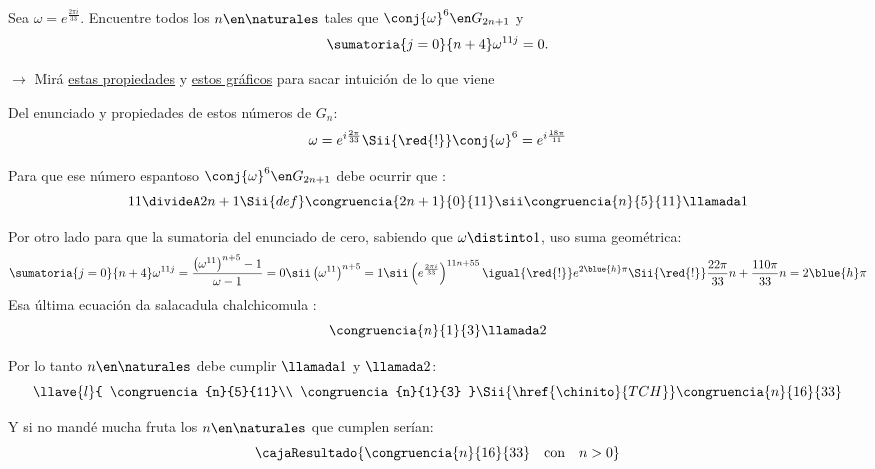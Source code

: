 \begin{enunciado}{\ejExtra}
  Sea $\omega = e^{\frac{2\pi i}{33}}$. Encuentre todos los $n \en \naturales$ tales que
  $\conj{\omega}^6 \en G_{2n+1}$ y
  $$
    \sumatoria{j=0}{n+4} \omega^{11j} = 0.
  $$
\end{enunciado}

\begin{center}
  $\to$ Mirá \hyperlink{teoria6:propiedadesGn}{estas propiedades} y  \hyperlink{teoria6:gruposGn}{estos gráficos} para sacar intuición de lo que viene
\end{center}

Del enunciado y propiedades de estos números de $G_n$:
$$
  \omega = e^{i\frac{2\pi }{33}}
  \Sii{\red{!}}
  \conj{\omega}^6 = e^{i\frac{18\pi }{11}}
$$

Para que ese número espantoso  $\conj{\omega}^6 \en G_{2n+1}$ debe ocurrir que \red{!!}:
$$
  11 \divideA 2n+1
  \Sii{def}
  \congruencia{2n+1}{0}{11}
  \sii
  \congruencia{n}{5}{11} \llamada1
$$

Por otro lado para que la sumatoria del enunciado de cero, sabiendo que $\omega \distinto 1$, uso suma geométrica:
$$
  \sumatoria{j=0}{n+4} \omega^{11j}
  =
  \frac{\left(\omega^{11} \right)^{n + 5} - 1}{\omega - 1} = 0
  \sii
  \left(\omega^{11} \right)^{n + 5} = 1
  \sii
  \left(e^{\frac{2\pi i}{33}}\right)^{11n + 55} \igual{\red{!}} e^{2\blue{h}\pi}
  \Sii{\red{!}}
  \frac{22\pi}{33}n + \frac{110\pi}{33}n = 2\blue{h}\pi
$$
Esa última ecuación da {\tiny salacadula chalchicomula} \magic:
$$
  \congruencia{n}{1}{3} \llamada2
$$

Por lo tanto $n \en \naturales$ debe cumplir $\llamada1$ y $\llamada2$:
$$
  \llave{l}{
    \congruencia{n}{5}{11}\\
    \congruencia{n}{1}{3}
  }
  \Sii{\href{\chinito}{TCH}}
  \congruencia{n}{16}{33}
$$

Y si no mandé mucha fruta los $n \en \naturales$ que cumplen serían:
$$
  \cajaResultado{
    \congruencia{n}{16}{33}
    \quad \text{con} \quad
    n > 0
  }
$$

\begin{aportes}
  \item {}
\end{aportes}
